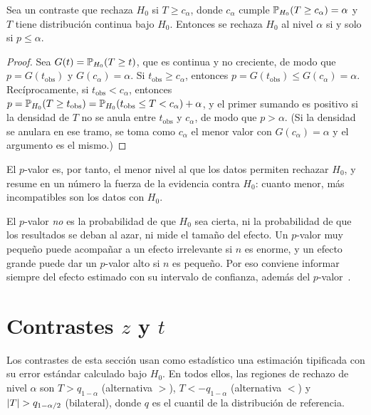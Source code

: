 \begin{proposicion}\label{prop:t5-pvalor}
Sea un contraste que rechaza $H_0$ si $T\ge c_\alpha$, donde $c_\alpha$ cumple $\mathbb{P}_{H_0}(T\ge c_\alpha)=\alpha$ y $T$ tiene distribución continua bajo $H_0$. Entonces se rechaza $H_0$ al nivel $\alpha$ si y solo si $p\le\alpha$.
\end{proposicion}

\begin{proof}
Sea $G(t)=\mathbb{P}_{H_0}(T\ge t)$, que es continua y no creciente, de modo que $p=G(t_{\mathrm{obs}})$ y $G(c_\alpha)=\alpha$. Si $t_{\mathrm{obs}}\ge c_\alpha$, entonces $p=G(t_{\mathrm{obs}})\le G(c_\alpha)=\alpha$. Recíprocamente, si $t_{\mathrm{obs}}<c_\alpha$, entonces $p=\mathbb{P}_{H_0}(T\ge t_{\mathrm{obs}})=\mathbb{P}_{H_0}(t_{\mathrm{obs}}\le T<c_\alpha)+\alpha$, y el primer sumando es positivo si la densidad de $T$ no se anula entre $t_{\mathrm{obs}}$ y $c_\alpha$, de modo que $p>\alpha$. (Si la densidad se anulara en ese tramo, se toma como $c_\alpha$ el menor valor con $G(c_\alpha)=\alpha$ y el argumento es el mismo.)
\end{proof}

El $p$-valor es, por tanto, el menor nivel al que los datos permiten rechazar $H_0$, y resume en un número la fuerza de la evidencia contra $H_0$: cuanto menor, más incompatibles son los datos con $H_0$.

\begin{observacion}\label{obs:t5-pvalor}
El $p$-valor \emph{no} es la probabilidad de que $H_0$ sea cierta, ni la probabilidad de que los resultados se deban al azar, ni mide el tamaño del efecto. Un $p$-valor muy pequeño puede acompañar a un efecto irrelevante si $n$ es enorme, y un efecto grande puede dar un $p$-valor alto si $n$ es pequeño. Por eso conviene informar siempre del efecto estimado con su intervalo de confianza, además del $p$-valor~\cite[lecturas~17b y~20]{mit1805}.
\end{observacion}

\section{Contrastes \texorpdfstring{$z$}{z} y \texorpdfstring{$t$}{t}}

Los contrastes de esta sección usan como estadístico una estimación tipificada con su error estándar calculado bajo $H_0$. En todos ellos, las regiones de rechazo de nivel $\alpha$ son $T>q_{1-\alpha}$ (alternativa $>$), $T<-q_{1-\alpha}$ (alternativa $<$) y $\lvert T\rvert>q_{1-\alpha/2}$ (bilateral), donde $q$ es el cuantil de la distribución de referencia.

